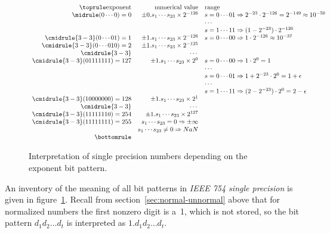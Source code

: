 \begin{figure}[ht]
  \begin{equation}
  \begin{array}{rrl}
    \toprule
    \hbox{exponent}&\hbox{numerical value}&\hbox{range}\\
    \midrule
    (0\cdots0)=0& \pm 0.s_1\cdots s_{23}\times 2^{-126}
            &s=0\cdots 01\Rightarrow 2^{-23}\cdot 2^{-126}=2^{-149}\approx 10^{-50}\\
    &       &\cdots\\
    &       &s=1\cdots 11\Rightarrow (1-2^{-23})\cdot 2^{-126}\\
    \cmidrule{3-3}
    (0\cdots 01)=1& \pm 1.s_1\cdots s_{23}\times 2^{-126}
            &s=0\cdots 00\Rightarrow 1\cdot 2^{-126}\approx 10^{-37}\\
    \cmidrule{3-3}
    (0\cdots 010)=2& \pm 1.s_1\cdots s_{23}\times 2^{-125}&\\
    \cmidrule{3-3}
    &\cdots&\\
    \cmidrule{3-3}
    (01111111)=127 & \pm 1.s_1\cdots s_{23}\times 2^{0}
            &s=0\cdots 00\Rightarrow 1\cdot 2^{0}=1\\
    &       &\cdots\\
    &       &s=0\cdots 01\Rightarrow 1+2^{-23}\cdot 2^{0}=1+\epsilon\\
    &       &\cdots\\
    &       &s=1\cdots 11\Rightarrow (2-2^{-23})\cdot 2^{0}=2-\epsilon\\
    \cmidrule{3-3}
    (10000000)=128 & \pm 1.s_1\cdots s_{23}\times 2^{1}&\\
    \cmidrule{3-3}
    &\cdots&\\
    \cmidrule{3-3}
    (11111110)=254 & \pm 1.s_1\cdots s_{23}\times 2^{127}&\\
    \cmidrule{3-3}
    (11111111)=255 & s_1\cdots s_{23}=0 \Rightarrow \pm\infty &\\
                   & s_1\cdots s_{23}\not=0 \Rightarrow NaN &\\
    \bottomrule
  \end{array}
  \end{equation}
  \caption{Interpretation of single precision numbers depending on the exponent bit pattern.}
  \label{fig:single-precision}
\end{figure}

An inventory of the meaning of all bit patterns in
\emph{IEEE 754 single precision}
is given in figure~\ref{fig:single-precision}.
Recall from section~\ref{sec:normal-unnormal} above
that for normalized numbers the first nonzero digit is a~1, which
is not stored, so the bit pattern $d_1d_2\ldots d_t$ is interpreted as
$1.d_1d_2\ldots d_t$.

